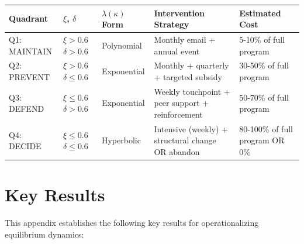 \documentclass[11pt, a4paper]{article}
\begin{document}
\begin{center}
\small
\begin{tabular}{|p{1.8cm}|p{1.8cm}|p{1.8cm}|p{1.8cm}|p{1.8cm}|}
\hline
\textbf{Quadrant} & \textbf{$\xi$, $\delta$} & \textbf{$\lambda(\kappa)$ Form} &
\textbf{Intervention Strategy} & \textbf{Estimated Cost} \\
\hline

Q1: MAINTAIN
& $\xi > 0.6$ $\delta > 0.6$
& Polynomial
& Monthly email + annual event
& 5-10\% of full program \\

\hline

Q2: PREVENT
& $\xi > 0.6$ $\delta \leq 0.6$
& Exponential
& Monthly + quarterly + targeted subsidy
& 30-50\% of full program \\

\hline

Q3: DEFEND
& $\xi \leq 0.6$ $\delta > 0.6$
& Exponential
& Weekly touchpoint + peer support + reinforcement
& 50-70\% of full program \\

\hline

Q4: DECIDE
& $\xi \leq 0.6$ $\delta \leq 0.6$
& Hyperbolic
& Intensive (weekly) + structural change OR abandon
& 80-100\% of full program OR 0\% \\

\hline
\end{tabular}
\end{center}


\section{Key Results}
\label{sec:bb-results}

This appendix establishes the following key results for operationalizing equilibrium dynamics:
\end{document}
